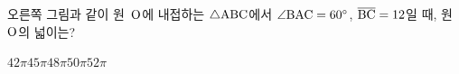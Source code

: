 \noindent\begin{minipage}[t]{0.58\linewidth}\vspace{0pt}\raggedright 오른쪽 그림과 같이 원~$\mathrm{O}$에 내접하는 $\triangle\mathrm{ABC}$에서 $\angle\mathrm{BAC}=60^\circ$, $\overline{\mathrm{BC}}=12$일 때, 원~$\mathrm{O}$의 넓이는?\end{minipage}\hfill\begin{minipage}[t]{0.4\linewidth}\vspace{0pt}\centering \resizebox{\ifdim\width>\linewidth\linewidth\else\width\fi}{!}{}\end{minipage}\par
\begin{choicesii}{$42\pi$}{$45\pi$}{$48\pi$}{$50\pi$}{$52\pi$}\end{choicesii}
